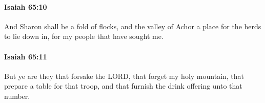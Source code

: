 		\paragraph{Isaiah 65:10} %
			\label{ISAIAH-65-10}

			And Sharon shall be a fold of flocks, and the valley of Achor a place for the herds to lie down in, for my people that have sought me.


		\paragraph{Isaiah 65:11} %
			\label{ISAIAH-65-11}

			But ye are they that forsake the LORD, that forget my holy mountain, that prepare a table for that troop, and that furnish the drink offering unto that number.


